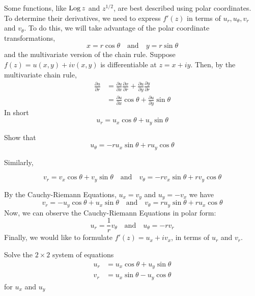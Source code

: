 \documentclass[handout]{ximera}
\begin{document}
Some functions, like $\operatorname{Log} z$ and $z^{1/2}$, are best described using polar coordinates. To determine their derivatives, we need 
to express $f'(z)$ in terms of $u_r, u_\theta, v_r$ and $v_\theta$. To do this, we will take advantage of the polar coordinate transformations,
\[
x = r\cos \theta \quad \mbox{and} \quad y=r\sin \theta
\]
and the multivariate version of the chain rule.
Suppose $f(z) = u(x,y) + iv(x,y)$ is differentiable at $z = x+iy$.
Then, by the multivariate chain rule,
\begin{align*}
\frac{\partial u}{\partial r} &= \frac{\partial u}{\partial x}\frac{\partial x}{\partial r}+\frac{\partial u}{\partial y}\frac{\partial y}{\partial r}\\
                              &= \frac{\partial u}{\partial x} \cos\theta + \frac{\partial u}{\partial y} \sin \theta
\end{align*}
In short
\[
u_r = u_x \cos \theta + u_y \sin\theta
\]
\begin{problem}
Show that
\[
u_\theta = -ru_x \sin \theta + ru_y \cos\theta
\]
\end{problem}

Similarly,

\[
 v_r = v_x \cos \theta + v_y \sin\theta \quad \mbox{and} \quad  v_\theta = -rv_x \sin \theta + rv_y \cos\theta
\]

By the Cauchy-Riemann Equations, $u_x = v_y$ and $u_y = -v_x$ we have
\[
v_r = -u_y \cos \theta + u_x \sin\theta \quad \mbox{and} \quad  v_\theta = ru_y \sin \theta + ru_x \cos\theta
\]
Now, we can observe the Cauchy-Riemann Equations in polar form:
\[
u_r = \frac{1}{r} v_\theta \quad \mbox{and} \quad u_\theta = -rv_r
\]
Finally, we would like to formulate $f'(z) = u_x + iv_x$, in terms of $u_r$ and $v_r$.
\begin{problem} Solve the $2 \times 2$ system of equations
\begin{align*}
u_r &= u_x \cos \theta + u_y \sin\theta\\
v_r &= u_x \sin \theta -u_y \cos\theta
\end{align*}
for $u_x$ and $u_y$
\begin{multipleChoice}
\end{multipleChoice}
\end{problem}
\end{document}
